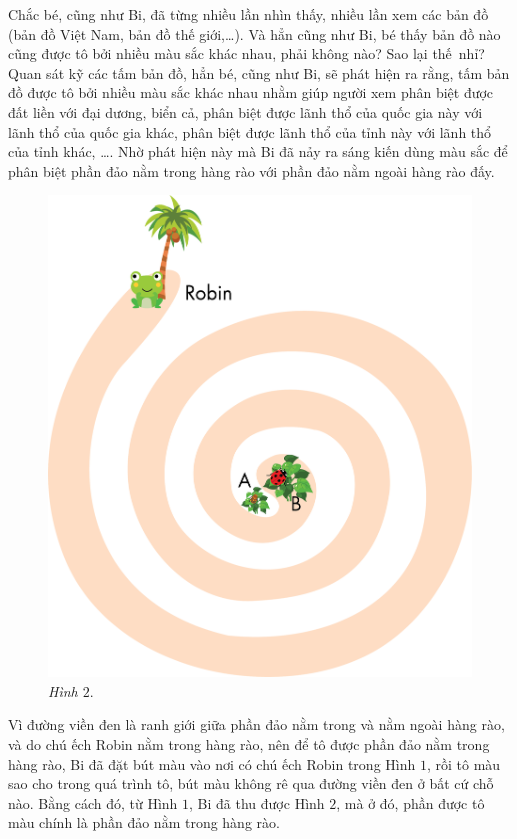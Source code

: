 \begin{multicols}{2}
\begin{figure}[H]
	\end{figure}
	Chắc bé, cũng như Bi, đã từng nhiều lần nhìn thấy, nhiều lần xem các bản đồ (bản đồ Việt Nam, bản đồ thế giới,\ldots). Và hẳn cũng như Bi, bé thấy bản đồ nào cũng được tô bởi nhiều màu sắc khác nhau, phải không nào? Sao lại thế~nhỉ?
	\vskip 0.1cm
	Quan sát kỹ các tấm bản đồ, hẳn bé, cũng như Bi, sẽ phát hiện ra rằng, tấm bản đồ được tô bởi nhiều màu sắc khác nhau nhằm giúp người xem phân biệt được đất liền với đại dương, biển cả, phân biệt được lãnh thổ của quốc gia này với lãnh thổ của quốc gia khác, phân biệt được lãnh thổ của tỉnh này với lãnh thổ của tỉnh khác, \ldots. Nhờ phát hiện này mà Bi đã nảy ra sáng kiến dùng màu sắc để phân biệt phần đảo nằm trong hàng rào với phần đảo nằm ngoài hàng rào đấy.
	\begin{figure}[H]
		\centering
		\vspace*{-10pt}
		\captionsetup{labelformat= empty, justification=centering}
		\includegraphics[width=1\linewidth]{2}
		\caption{\small\textit{Hình $2.$}}
		\vspace*{-10pt}
	\end{figure}
	Vì đường viền đen là ranh giới giữa phần đảo nằm trong và nằm ngoài hàng rào, và do chú ếch Robin nằm trong hàng rào, nên để tô được phần đảo nằm trong hàng rào, Bi đã đặt bút màu vào nơi có chú ếch Robin trong Hình $1$, rồi tô màu sao cho trong quá trình tô, bút màu không rê qua đường viền đen ở bất cứ chỗ nào. Bằng cách đó, từ Hình $1$, Bi đã thu được Hình $2$, mà ở đó, phần được tô màu chính là phần đảo nằm trong hàng rào.

\end{multicols}
